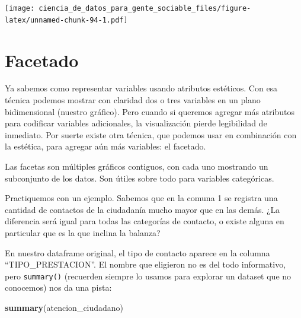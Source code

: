 \documentclass[spanish,]{book}
\newenvironment{Shaded}{\begin{snugshade}}{\end{snugshade}}
\newcommand{\KeywordTok}[1]{\textcolor[rgb]{0.13,0.29,0.53}{\textbf{#1}}}
\newcommand{\NormalTok}[1]{#1}
\begin{document}
\texttt{[image: ciencia\_de\_datos\_para\_gente\_sociable\_files/figure-latex/unnamed-chunk-94-1.pdf]}

\hypertarget{facetado}{%
\section{Facetado}\label{facetado}}

Ya sabemos como representar variables usando atributos estéticos. Con esa técnica podemos mostrar con claridad dos o tres variables en un plano bidimensional (nuestro gráfico). Pero cuando si queremos agregar más atributos para codificar variables adicionales, la visualización pierde legibilidad de inmediato. Por suerte existe otra técnica, que podemos usar en combinación con la estética, para agregar aún más variables: el facetado.

Las facetas son múltiples gráficos contiguos, con cada uno mostrando un subconjunto de los datos. Son útiles sobre todo para variables categóricas.

Practiquemos con un ejemplo. Sabemos que en la comuna 1 se registra una cantidad de contactos de la ciudadanía mucho mayor que en las demás. ¿La diferencia será igual para todas las categorías de contacto, o existe alguna en particular que es la que inclina la balanza?

En nuestro dataframe original, el tipo de contacto aparece en la columna ``TIPO\_PRESTACION''. El nombre que eligieron no es del todo informativo, pero \texttt{summary()} (recuerden siempre lo usamos para explorar un dataset que no conocemos) nos da una pista:

\begin{Shaded}
\begin{Highlighting}[]
\KeywordTok{summary}\NormalTok{(atencion_ciudadano)}
\end{Highlighting}
\end{Shaded}
\end{document}

